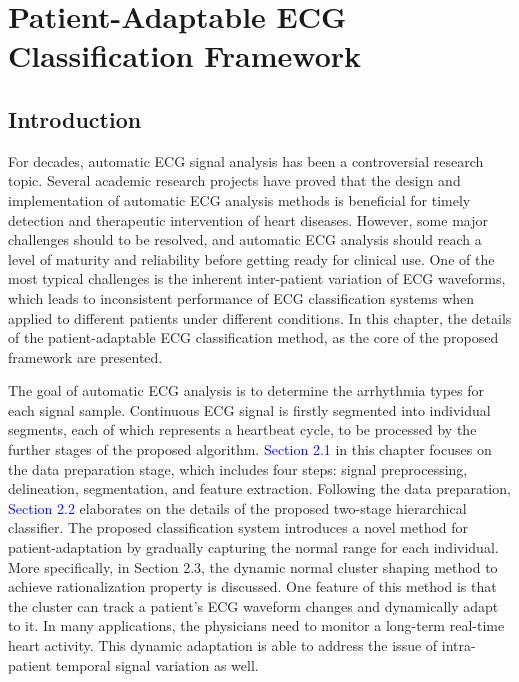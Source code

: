 \chapter{Patient-Adaptable ECG Classification Framework}

\section{Introduction}
For decades, automatic ECG signal analysis has been a controversial research topic. Several academic research projects have proved that the design and implementation of automatic ECG analysis methods is beneficial for timely detection and therapeutic intervention of heart diseases. However, some major challenges should to be resolved, and automatic ECG analysis should reach a level of maturity and reliability before getting ready for clinical use. One of the most typical challenges is the inherent inter-patient variation of ECG waveforms, which leads to inconsistent performance of ECG classification systems when applied to different patients under different conditions. In this chapter, the details of the patient-adaptable ECG classification method, as the core of the proposed framework are presented.

The goal of automatic ECG analysis is to determine the arrhythmia types for each signal sample. Continuous ECG signal is firstly segmented into individual segments, each of which represents a heartbeat cycle, to be processed by the further stages of the proposed algorithm. \textcolor{blue}{Section 2.1} in this chapter focuses on the data preparation stage, which includes four steps: signal preprocessing, delineation, segmentation, and feature extraction. Following the data preparation, \textcolor{blue}{Section 2.2} elaborates on the details of the proposed two-stage hierarchical classifier. The proposed classification system introduces a novel method for patient-adaptation by gradually capturing the normal range for each individual. More specifically, in Section 2.3, the dynamic normal cluster shaping method to achieve rationalization property is discussed. One feature of this method is that the cluster can track a patient's ECG waveform changes and dynamically adapt to it. In many applications, the physicians need to monitor a long-term real-time heart activity. This dynamic adaptation is able to address the issue of intra-patient temporal signal variation as well.


